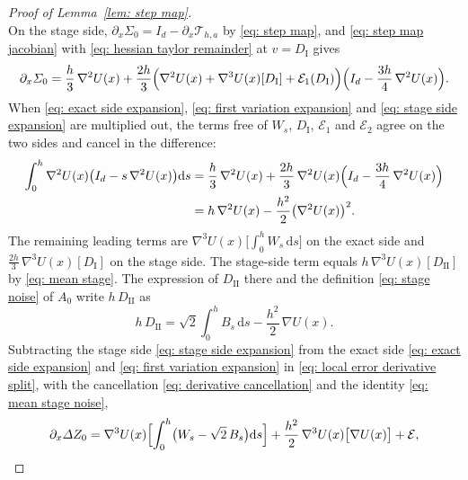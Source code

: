 \documentclass[namedate,webpdf,imanum]{ima-authoring-template}
\newcommand{\D}{\mathrm{d}}
\theoremstyle{thmstyletwo}
\numberwithin{equation}{section}
\begin{document}
\begin{proof}[Proof of Lemma~\ref{lem: step map}]
\begin{equation}
        \label{eq: E2 bound}
    \end{equation}
    On the stage side, $\partial_x \Sigma_0 = I_d - \partial_x \mathcal T_{h,a}$ by \eqref{eq: step map}, and \eqref{eq: step map jacobian} with \eqref{eq: hessian taylor remainder} at $v = D_{\mathrm I}$ gives
    \begin{equation}
        \partial_x \Sigma_0 = \frac h3\, \nabla^2 U(x)
        + \frac{2h}{3} \Bigl( \nabla^2 U(x) + \nabla^3 U(x)[D_{\mathrm I}] + \mathcal E_1(D_{\mathrm I}) \Bigr) \Bigl( I_d - \frac{3h}{4}\, \nabla^2 U(x) \Bigr) .
        \label{eq: stage side expansion}
    \end{equation}
    When \eqref{eq: exact side expansion}, \eqref{eq: first variation expansion} and \eqref{eq: stage side expansion} are multiplied out, the terms free of $W_s$, $D_{\mathrm I}$, $\mathcal E_1$ and $\mathcal E_2$ agree on the two sides and cancel in the difference:
    \begin{align}
        \int_0^h \nabla^2 U(x) \bigl( I_d - s\, \nabla^2 U(x) \bigr) \D s
        & = \frac h3\, \nabla^2 U(x) + \frac{2h}{3}\, \nabla^2 U(x) \Bigl( I_d - \frac{3h}{4}\, \nabla^2 U(x) \Bigr) \notag \\
        & = h\, \nabla^2 U(x) - \frac{h^2}{2} \bigl( \nabla^2 U(x) \bigr)^2 .
        \label{eq: derivative cancellation}
    \end{align}
    The remaining leading terms are $\nabla^3 U(x)\bigl[ \int_0^h W_s\,\D s \bigr]$ on the exact side and $\frac{2h}{3}\, \nabla^3 U(x)[D_{\mathrm I}]$ on the stage side. The stage-side term equals $h\, \nabla^3 U(x)[D_{\mathrm{II}}]$ by \eqref{eq: mean stage}. The expression of $D_{\mathrm{II}}$ there and the definition \eqref{eq: stage noise} of $A_0$ write $h\, D_{\mathrm{II}}$ as
    \begin{equation}
        h\, D_{\mathrm{II}} = \sqrt2 \int_0^h B_s\,\D s - \frac{h^2}{2}\, \nabla U(x) .
        \label{eq: mean stage noise}
    \end{equation}
    Subtracting the stage side \eqref{eq: stage side expansion} from the exact side \eqref{eq: exact side expansion} and \eqref{eq: first variation expansion} in \eqref{eq: local error derivative split}, with the cancellation \eqref{eq: derivative cancellation} and the identity \eqref{eq: mean stage noise},
    \begin{equation}
        \partial_x \Delta Z_0 = \nabla^3 U(x) \Bigl[ \int_0^h \bigl( W_s - \sqrt2\, B_s \bigr) \D s \Bigr] + \frac{h^2}{2}\, \nabla^3 U(x)\bigl[ \nabla U(x) \bigr] + \mathcal E ,

\end{equation}
\end{proof}
\end{document}
